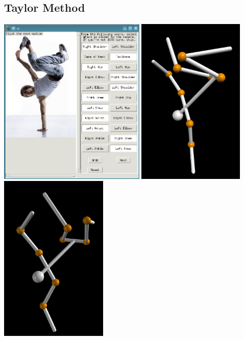 \documentclass[final]{article}
\begin{document}
\begin{spacing}{1.1}
\subsection{Taylor Method}
\begin{center}
  \includegraphics[height=8cm]{fig/breakdance.png}
  \includegraphics[height=8cm]{fig/breakdancerecons.png}
  \includegraphics[height=8cm]{fig/breakdancerecons2.png}
\end{center}


\end{spacing}
\end{document}
